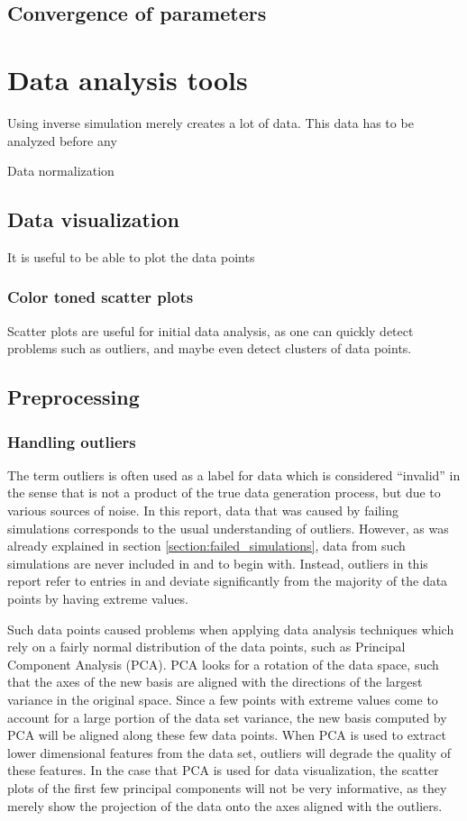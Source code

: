 \subsection{Convergence of parameters}

\section{Data analysis tools}\label{section:data_analysis_techniques}
Using inverse simulation merely creates a lot of data. This data has to be analyzed before any 

Data normalization

\subsection{Data visualization}
It is useful to be able to plot the data points 

\subsubsection{Color toned scatter plots}
Scatter plots are useful for initial data analysis, as one can quickly detect problems such as outliers, and maybe even detect clusters of data points. 

\subsection{Preprocessing}

\subsubsection{Handling outliers}
The term outliers is often used as a label for data which is considered ``invalid'' in the sense that is not a product of the true data generation process, but  due to various sources of noise. In this report, data that was caused by failing simulations corresponds to the usual understanding of outliers. However, as was already explained in section \ref{section:failed_simulations}, data from such simulations are never included in \datamatrixpar{} and \datamatrixfit{} to begin with. Instead, outliers in this report refer to entries in \datamatrixpar{} and \datamatrixfit{}  deviate significantly from the majority of the data points by having extreme values.

Such data points caused problems when applying data analysis techniques which rely on a fairly normal distribution of the data points, such as Principal Component Analysis (PCA). PCA looks for a rotation of the data space, such that the axes of the new basis are aligned with the directions of the largest variance in the original space. Since a few points with extreme values come to account for a large portion of the data set variance, the new basis computed by PCA will be aligned along these few data points. When PCA is used to extract lower dimensional features from the data set, outliers will degrade the quality of these features. In the case that PCA is used for data visualization, the scatter plots of the first few principal components will not be very informative, as they merely show the projection of the data onto the axes aligned with the outliers.


